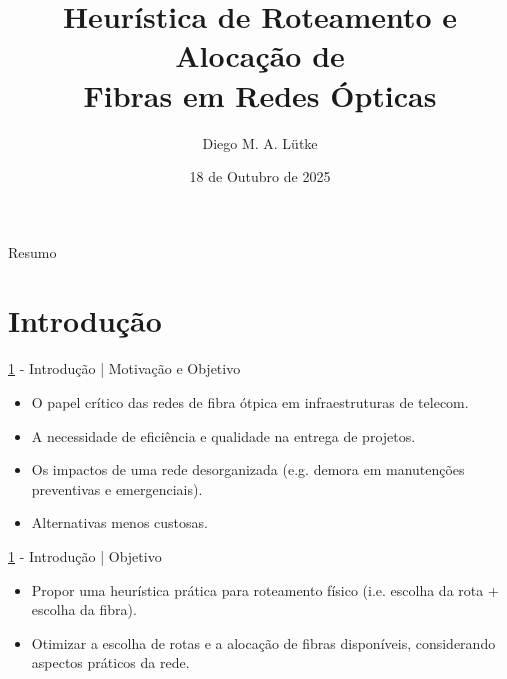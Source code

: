 \documentclass[aspectratio=169,xcolor=dvipsnames]{beamer}
\title{Heurística de Roteamento e Alocação de \\ Fibras em Redes Ópticas}
\author{Diego M. A. Lütke}
\institute
{
    Escola Politécnica \\
    Pontifícia Universidade Católica do Paraná
}
\date{18 de Outubro de 2025}
\begin{document}
\begin{frame}
    \titlepage
\end{frame}

\begin{frame}{Resumo}
    \tableofcontents
\end{frame}

\section{Introdução}\label{sec:introducao}
\begin{frame}{\ref{sec:introducao} - Introdução | Motivação e Objetivo}
  \begin{itemize}
    \item O papel crítico das redes de fibra ótpica em infraestruturas de telecom.
    \item A necessidade de eficiência e qualidade na entrega de projetos.
    \item Os impactos de uma rede desorganizada (e.g. demora em manutenções preventivas e emergenciais).
    \item Alternativas menos custosas.
  \end{itemize}
\end{frame}

\begin{frame}{\ref{sec:introducao} - Introdução | Objetivo}
  \begin{itemize}
    \item Propor uma heurística prática para roteamento físico (i.e. escolha da rota + escolha da fibra).
    \item Otimizar a escolha de rotas e a alocação de fibras disponíveis, considerando aspectos práticos da rede.
  \end{itemize}
\end{frame}
\end{document}
